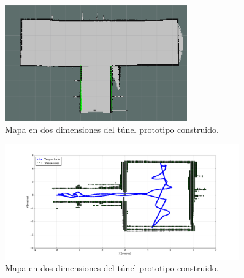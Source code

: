 \begin{figure}
  \centering \footnotesize
  \includegraphics[width=0.70\textwidth]{images/random_2D.png}
  \captionsetup{font=footnotesize}
  \caption{Mapa en dos dimensiones del túnel prototipo construido.}
  \label{fig:SLAM201}
\end{figure}

\begin{figure}
  \centering \footnotesize
  \includegraphics[width=0.90\textwidth]{images/random_tajectory.png}
  \captionsetup{font=footnotesize}
  \caption{Mapa en dos dimensiones del túnel prototipo construido.}
  \label{fig:SLAM201}
\end{figure}

